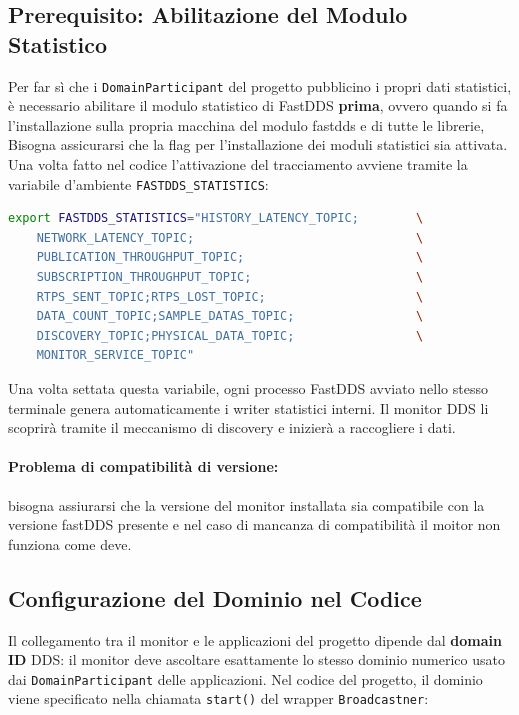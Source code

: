 \subsection{Prerequisito: Abilitazione del Modulo Statistico}

Per far sì che i \texttt{DomainParticipant} del progetto pubblicino i propri dati statistici, è necessario abilitare il modulo statistico di FastDDS \textbf{prima}, ovvero quando si fa l'installazione sulla propria macchina del modulo fastdds e di tutte le librerie, Bisogna assicurarsi che la flag per l'installazione dei moduli statistici sia attivata. Una volta fatto nel codice l'attivazione del tracciamento avviene tramite la variabile d'ambiente \texttt{FASTDDS\_STATISTICS}:

\begin{lstlisting}[language=bash, caption={Abilitazione di tutti i topic statistici FastDDS}]
	export FASTDDS_STATISTICS="HISTORY_LATENCY_TOPIC;        \
	NETWORK_LATENCY_TOPIC;                               \
	PUBLICATION_THROUGHPUT_TOPIC;                        \
	SUBSCRIPTION_THROUGHPUT_TOPIC;                       \
	RTPS_SENT_TOPIC;RTPS_LOST_TOPIC;                     \
	DATA_COUNT_TOPIC;SAMPLE_DATAS_TOPIC;                 \
	DISCOVERY_TOPIC;PHYSICAL_DATA_TOPIC;                 \
	MONITOR_SERVICE_TOPIC"
\end{lstlisting}

Una volta settata questa variabile, ogni processo FastDDS avviato nello stesso terminale genera automaticamente i writer statistici interni. Il monitor DDS li scoprirà tramite il meccanismo di discovery e inizierà a raccogliere i dati.
\paragraph{Problema di compatibilità di versione:}
bisogna assiurarsi che la versione del monitor installata sia compatibile con la versione fastDDS presente e nel caso di mancanza di compatibilità il moitor non funziona come deve.

\subsection{Configurazione del Dominio nel Codice}

Il collegamento tra il monitor e le applicazioni del progetto dipende dal \textbf{domain ID} DDS: il monitor deve ascoltare esattamente lo stesso dominio numerico usato dai \texttt{DomainParticipant} delle applicazioni. Nel codice del progetto, il dominio viene specificato nella chiamata \texttt{start()} del wrapper \texttt{Broadcastner}:

